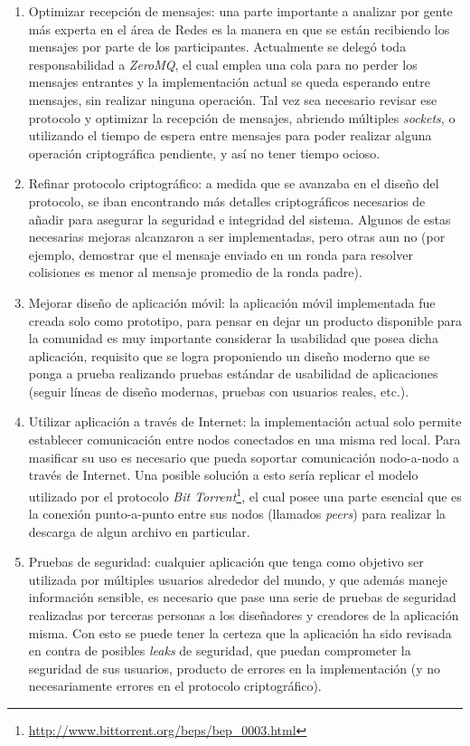 \begin{enumerate}
    \item Optimizar recepción de mensajes: una parte importante a analizar por gente 
    más experta en el área de Redes es la manera en que se están recibiendo los 
    mensajes por parte de los participantes. Actualmente se delegó toda responsabilidad 
    a \emph{ZeroMQ}, el cual emplea una cola para no perder los mensajes entrantes 
    y la implementación actual se queda esperando entre mensajes, sin realizar 
    ninguna operación. Tal vez sea necesario revisar ese protocolo y optimizar la 
    recepción de mensajes, abriendo múltiples \emph{sockets}, o utilizando el tiempo 
    de espera entre mensajes para poder realizar alguna operación criptográfica 
    pendiente, y así no tener tiempo ocioso.
    
    \item Refinar protocolo criptográfico: a medida que se avanzaba en el diseño del 
    protocolo, se iban encontrando más detalles criptográficos necesarios de añadir 
    para asegurar la seguridad e integridad del sistema. Algunos de estas necesarias 
    mejoras alcanzaron a ser implementadas, pero otras aun no (por ejemplo, demostrar 
    que el mensaje enviado en un ronda para resolver colisiones es menor al mensaje 
    promedio de la ronda padre).
    
    \item Mejorar diseño de aplicación móvil: la aplicación móvil implementada fue 
    creada solo como prototipo, para pensar en dejar un producto disponible para la 
    comunidad es muy importante considerar la usabilidad que posea dicha aplicación, 
    requisito que se logra proponiendo un diseño moderno que se ponga a prueba 
    realizando pruebas estándar de usabilidad de aplicaciones (seguir líneas de diseño 
    modernas, pruebas con usuarios reales, etc.).
    
    \item Utilizar aplicación a través de Internet: la implementación actual solo 
    permite establecer comunicación entre nodos conectados en una misma red local. Para 
    masificar su uso es necesario que pueda soportar comunicación nodo-a-nodo a través 
    de Internet. Una posible solución a esto sería replicar el modelo utilizado por el 
    protocolo \emph{Bit Torrent}\footnote{\url{http://www.bittorrent.org/beps/bep_0003.html}}, el cual 
    posee una parte esencial que es la conexión punto-a-punto entre sus nodos (llamados 
    \emph{peers}) para realizar la descarga de algun archivo en particular.
    
    \item Pruebas de seguridad: cualquier aplicación que tenga como objetivo ser 
    utilizada por múltiples usuarios alrededor del mundo, y que además maneje 
    información sensible, es necesario que pase una serie de pruebas de seguridad 
    realizadas por terceras personas a los diseñadores y creadores de la aplicación 
    misma. Con esto se puede tener la certeza que la aplicación ha sido revisada en 
    contra de posibles \emph{leaks} de seguridad, que puedan comprometer la seguridad 
    de sus usuarios, producto de errores en la implementación (y no necesariamente 
    errores en el protocolo criptográfico).
\end{enumerate}